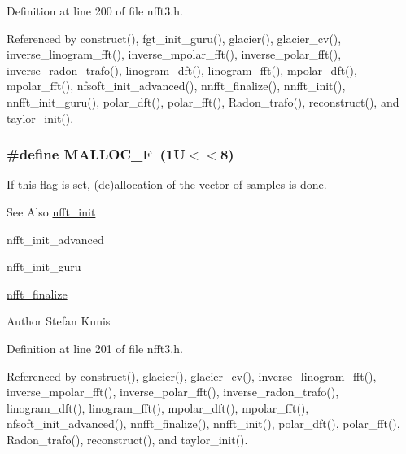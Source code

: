 Definition at line 200 of file nfft3.\-h.



Referenced by construct(), fgt\-\_\-init\-\_\-guru(), glacier(), glacier\-\_\-cv(), inverse\-\_\-linogram\-\_\-fft(), inverse\-\_\-mpolar\-\_\-fft(), inverse\-\_\-polar\-\_\-fft(), inverse\-\_\-radon\-\_\-trafo(), linogram\-\_\-dft(), linogram\-\_\-fft(), mpolar\-\_\-dft(), mpolar\-\_\-fft(), nfsoft\-\_\-init\-\_\-advanced(), nnfft\-\_\-finalize(), nnfft\-\_\-init(), nnfft\-\_\-init\-\_\-guru(), polar\-\_\-dft(), polar\-\_\-fft(), Radon\-\_\-trafo(), reconstruct(), and taylor\-\_\-init().

\hypertarget{group__nfft_gaa7b5098f4136080bbe0dd989973e2a69}{
\subsubsection[{M\-A\-L\-L\-O\-C\-\_\-\-F}]{\setlength{\rightskip}{0pt plus 5cm}\#define M\-A\-L\-L\-O\-C\-\_\-\-F~(1\-U$<$$<$8)}}\label{group__nfft_gaa7b5098f4136080bbe0dd989973e2a69}
If this flag is set, (de)allocation of the vector of samples is done.

\begin{DoxySeeAlso}{See Also}
\hyperlink{group__nfft_ga1dfeaf18f3735f035afa62ca768d99c4}{nfft\-\_\-init} 

nfft\-\_\-init\-\_\-advanced 

nfft\-\_\-init\-\_\-guru 

\hyperlink{group__nfft_ga614f9f7af5b0d5491afa9495393c4dc3}{nfft\-\_\-finalize} 
\end{DoxySeeAlso}
\begin{DoxyAuthor}{Author}
Stefan Kunis 
\end{DoxyAuthor}


Definition at line 201 of file nfft3.\-h.



Referenced by construct(), glacier(), glacier\-\_\-cv(), inverse\-\_\-linogram\-\_\-fft(), inverse\-\_\-mpolar\-\_\-fft(), inverse\-\_\-polar\-\_\-fft(), inverse\-\_\-radon\-\_\-trafo(), linogram\-\_\-dft(), linogram\-\_\-fft(), mpolar\-\_\-dft(), mpolar\-\_\-fft(), nfsoft\-\_\-init\-\_\-advanced(), nnfft\-\_\-finalize(), nnfft\-\_\-init(), polar\-\_\-dft(), polar\-\_\-fft(), Radon\-\_\-trafo(), reconstruct(), and taylor\-\_\-init().

